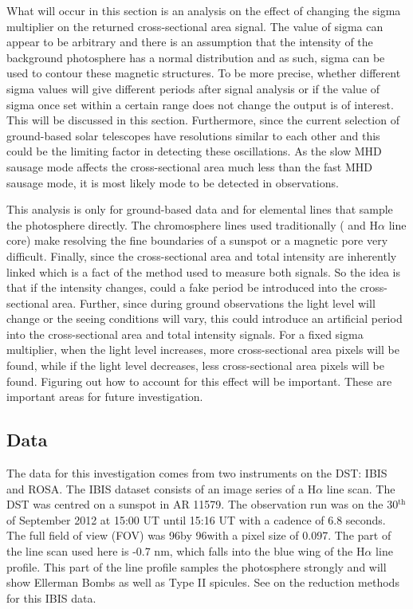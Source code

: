 	What will occur in this section is an analysis on the effect of changing the sigma multiplier on the returned cross-sectional area signal.
    The value of sigma can appear to be arbitrary and there is an assumption that the intensity of the background photosphere has a normal distribution and as such, sigma can be used to contour these magnetic structures.
    To be more precise, whether different sigma values will give different periods after signal analysis or if the value of sigma once set within a certain range does not change the output is of interest.
    This will be discussed in this section.
    Furthermore, since the current selection of ground-based solar telescopes have resolutions similar to each other and this could be the limiting factor in detecting these oscillations.
    As the slow MHD sausage mode affects the cross-sectional area much less than the fast MHD sausage mode, it is most likely mode to be detected in observations.
    
	This analysis is only for ground-based data and for elemental lines that sample the photosphere directly.
	The chromosphere lines used traditionally ( and H$\alpha$ line core) make resolving the fine boundaries of a sunspot or a magnetic pore very difficult.
	Finally, since the cross-sectional area and total intensity are inherently linked which is a fact of the method used to measure both signals.
	So the idea is that if the intensity changes, could a fake period be introduced into the cross-sectional area.
    Further, since during ground observations the light level will change or the seeing conditions will vary, this could introduce an artificial period into the cross-sectional area and total intensity signals.
    For a fixed sigma multiplier, when the light level increases, more cross-sectional area pixels will be found, while if the light level decreases, less cross-sectional area pixels will be found. 
    Figuring out how to account for this effect will be important. 
    These are important areas for future investigation.
    
    \subsection{Data}
    
    The data for this investigation comes from two instruments on the DST: IBIS and ROSA.
    The IBIS dataset consists of an image series of a H$\alpha$ line scan.
    The DST was centred on a sunspot in AR 11579.
    The observation run was on the 30$^{\mathrm{th}}$ of September 2012 at 15:00 UT until 15:16 UT with a cadence of 6.8 seconds.
    The full field of view (FOV) was 96\arcsecs by 96\arcsecs with a pixel size of 0.097\arcsecs.
    The part of the line scan used here is -0.7 nm, which falls into the blue wing of the H$\alpha$ line profile.
    This part of the line profile samples the photosphere strongly and will show Ellerman Bombs as well as Type II spicules.
    See \cite{2013A&A...560A..31N} on the reduction methods for this IBIS data.


